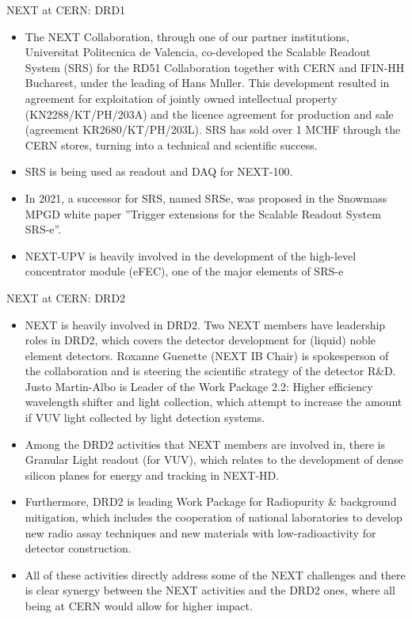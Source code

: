 \documentclass [aspectratio=169]{beamer}
\begin{document}
\begin{frame}{NEXT at CERN: DRD1}


\begin{itemize}
\item The NEXT Collaboration, through one of our partner institutions, Universitat Politecnica de Valencia, co-developed the Scalable Readout System (SRS) for the RD51 Collaboration together with CERN and IFIN-HH Bucharest, under the leading of Hans Muller. This development resulted in agreement for exploitation of jointly owned intellectual property
(KN2288/KT/PH/203A) and the licence agreement for production and sale (agreement KR2680/KT/PH/203L). SRS has sold over 1 MCHF through the CERN stores, turning into a technical and scientiﬁc success.
\item SRS is being used as readout and DAQ for NEXT-100.
\item  In 2021, a successor for SRS, named SRSe, was proposed in the Snowmass MPGD white paper ”Trigger extensions for the Scalable Readout System SRS-e”. 
\item NEXT-UPV is heavily involved in the development of the high-level concentrator module (eFEC), one of the major elements of SRS-e
\end{itemize}

\end{frame}

\begin{frame}{NEXT at CERN: DRD2}

\begin{itemize}

\item NEXT is heavily involved in DRD2. Two NEXT members have leadership roles in DRD2, which covers the detector development for (liquid) noble element detectors. Roxanne Guenette (NEXT IB Chair) is spokesperson of the collaboration and is steering the scientific strategy of the detector R\&D. Justo Martin-Albo is Leader of the Work Package 2.2: Higher efficiency wavelength shifter and light collection, which attempt to increase the amount if VUV light collected by light detection systems. 
\item Among the DRD2 activities that NEXT members are involved in, there is Granular Light readout (for VUV), which relates to the development of dense silicon planes for energy and tracking in NEXT-HD.
\item  Furthermore, DRD2 is leading Work Package for Radiopurity \&
background mitigation, which includes the cooperation of national laboratories to develop new radio assay techniques and new materials with low-radioactivity for detector construction. 
\item All of these activities directly address some of the NEXT challenges and there is clear synergy between the NEXT activities and the DRD2 ones, where all being at CERN would allow for higher impact.
\end{itemize}
\end{frame}
\end{document}
